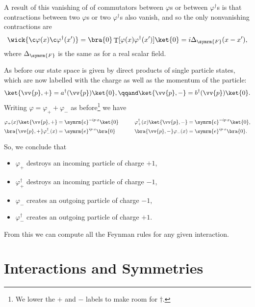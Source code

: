 \documentclass[fleqn]{NotesClass}
\newcommand{\e}{\symrm{e}}
\newcommand{\hermit}{{\dagger}}
\DeclareMathOperator{\timeOrdering}{T}
\newcommand{\feynman}{\symrm{F}}
\begin{document}
    A result of this vanishing of of commutators between \(\varphi\)s or between \(\varphi^\hermit\)s is that contractions between two \(\varphi\)s or two \(\varphi^\hermit\)s also vanish, and so the only nonvanishing contractions are
    \begin{equation}
        \wick{\c \varphi(x) \c \varphi^\hermit(x')} = \bra{0} \timeOrdering[\varphi(x) \varphi^\hermit(x')] \ket{0} = i\Delta_{\feynman}(x - x'),
    \end{equation}
    where \(\Delta_{\feynman}\) is the same as for a real scalar field.
    
    As before our state space is given by direct products of single particle states, which are now labelled with the charge as well as the momentum of the particle:
    \begin{equation}
        \ket{\vv{p}, +} = a^\hermit(\vv{p})\ket{0}, \qqand \ket{\vv{p}, -} = b^\hermit(\vv{p})\ket{0}.
    \end{equation}
    Writing \(\varphi = \varphi_+ + \varphi_-\) as before\footnote{We lower the \(+\) and \(-\) labels to make room for \(\hermit\).} we have
    \begin{alignat}{2}
        \varphi_+(x)\ket{\vv{p}, +} &= \e^{-ip\cdot x} \ket{0} \qquad & \varphi_+^\hermit(x)\ket{\vv{p}, -} &= \e^{-ip\cdot x}\ket{0},\\
        \bra{\vv{p}, +}\varphi_-^\hermit(x) &= \e^{ip\cdot x} \bra{0} \qquad & \bra{\vv{p}, -} \varphi_-(x) &= \e^{ip\cdot x}\bra{0}.
    \end{alignat}
    
    So, we conclude that
    \begin{itemize}
        \item \(\varphi_+\) destroys an incoming particle of charge \(+1\),
        \item \(\varphi_+^\hermit\) destroys an incoming particle of charge \(-1\),
        \item \(\varphi_-\) creates an outgoing particle of charge \(-1\),
        \item \(\varphi_-^\hermit\) creates an outgoing particle of charge \(+1\).
    \end{itemize}
    From this we can compute all the Feynman rules for any given interaction.
    
    \chapter{Interactions and Symmetries}
\end{document}
